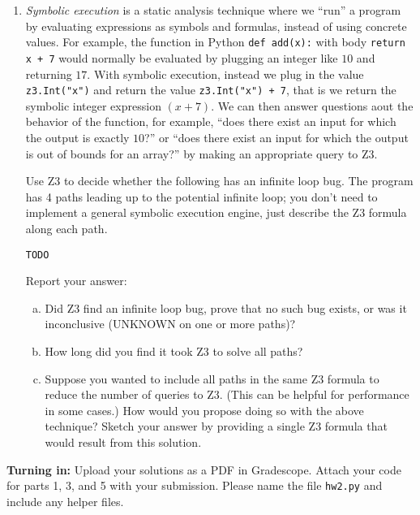 \documentclass{article}
\begin{document}
\begin{enumerate}
\item
\emph{Symbolic execution} is a static analysis technique where we ``run'' a program by evaluating expressions as symbols and formulas, instead of using concrete values.
For example, the function in Python \texttt{def add(x):} with body \texttt{return x + 7} would normally be evaluated
by plugging an integer like $10$ and returning $17$. With symbolic execution, instead we plug in the value
\texttt{z3.Int("x")} and return the value \texttt{z3.Int("x") + 7}, that is we return the symbolic integer expression $(x + 7)$. We can then answer questions aout the behavior of the function, for example, ``does there exist an input for which the output is exactly $10$?'' or ``does there exist an input for which the output is out of bounds for an array?'' by making an appropriate query to Z3.

Use Z3 to decide whether the following has an infinite loop bug.
The program has 4 paths leading up to the potential infinite loop; you don't need to implement a general symbolic execution engine, just describe the Z3 formula along each path.

\begin{verbatim}
TODO
\end{verbatim}

Report your answer:

\begin{enumerate}[(a)]
\item Did Z3 find an infinite loop bug, prove that no such bug exists, or was it inconclusive (UNKNOWN on one or more paths)?
\item How long did you find it took Z3 to solve all paths?
\item Suppose you wanted to include all paths in the same Z3 formula to reduce the number of queries to Z3.
(This can be helpful for performance in some cases.) How would you propose doing so with the above technique?
Sketch your answer by providing a single Z3 formula that would result from this solution.
\end{enumerate}

\end{enumerate}

\noindent
\textbf{Turning in:}
Upload your solutions as a PDF in Gradescope.
Attach your code for parts 1, 3, and 5 with your submission.
Please name the file \texttt{hw2.py} and include any helper files.
\end{document}
